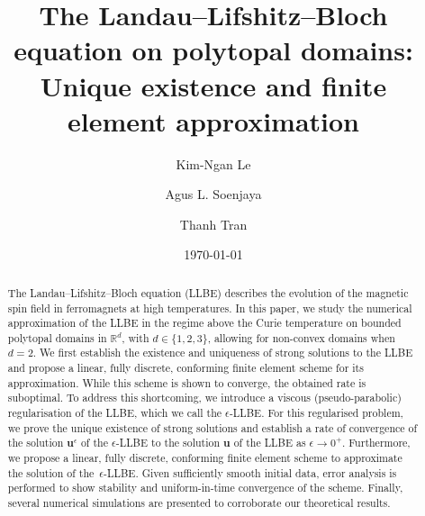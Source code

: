 \documentclass[11pt,reqno]{amsart}
\theoremstyle{definition}
\numberwithin{equation}{section}
\newcommand{\bff}{\boldsymbol}
\newcommand{\bb}{\mathbb}
\begin{document}
\title{
The Landau--Lifshitz--Bloch equation on polytopal domains: Unique existence and
finite element approximation
}
\author{Kim-Ngan Le}
\address{School of Mathematics,
         Monash University,
         Clayton 3800, Australia}
\email{\textcolor[rgb]{0.00,0.00,0.84}{ngan.le@monash.edu}}

\author{Agus L. Soenjaya}
\address{School of Mathematics and Statistics, The University of New South Wales, Sydney 2052, Australia}
\email{\textcolor[rgb]{0.00,0.00,0.84}{a.soenjaya@unsw.edu.au}}

\author{Thanh Tran}
\address{School of Mathematics and Statistics,
         The University of New South Wales,
         Sydney 2052, Australia}
\email{\textcolor[rgb]{0.00,0.00,0.84}{thanh.tran@unsw.edu.au}}

\date{\today}

\begin{abstract}
The Landau--Lifshitz--Bloch equation (LLBE) describes the evolution of the
magnetic spin field in ferromagnets at high temperatures. In this paper, we study the numerical approximation of the LLBE {in the regime above the Curie temperature} on bounded polytopal domains in $\bb{R}^d$, with {$d\in \{1,2,3\}$}, allowing for non-convex domains when $d=2$. We first establish the existence and uniqueness of strong solutions to the LLBE and propose a linear, fully discrete, conforming finite element scheme for its approximation. While this scheme is shown to converge, the obtained rate is suboptimal. To address this shortcoming, we introduce a viscous
(pseudo-parabolic) regularisation of the LLBE, which we call the $\epsilon$-LLBE. For this regularised problem, we prove the unique existence of strong solutions and establish a rate of convergence of the solution
$\bff{u}^\epsilon$ of the $\epsilon$-LLBE to the
solution $\bff{u}$ of the LLBE as $\epsilon\to 0^+$. Furthermore, we propose a
linear, fully discrete, conforming finite element scheme to approximate the solution of the~$\epsilon$-LLBE. Given sufficiently smooth initial data, error analysis is performed to show stability and uniform-in-time convergence of the scheme. Finally, several numerical simulations are presented to corroborate our theoretical results.
\end{abstract}
\maketitle
\tableofcontents


\end{document}
